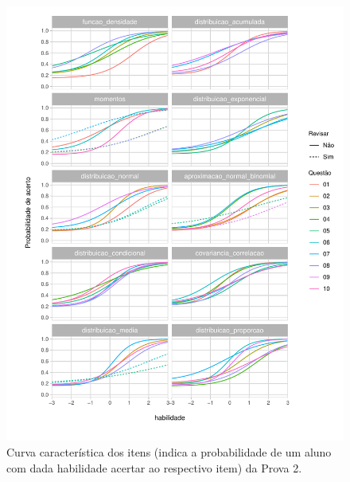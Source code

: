\documentclass[a4paper]{report}
\begin{document}
\begin{figure}
\centering
\includegraphics{Relatorio_files/figure-latex/unnamed-chunk-7-1.pdf}
\caption{Curva característica dos itens (indica a probabilidade de um
aluno com dada habilidade acertar ao respectivo item) da Prova 2.}
\end{figure}
\end{document}
